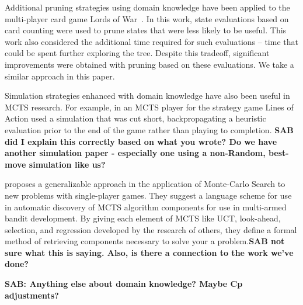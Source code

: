 \documentclass[letterpaper]{article}
\begin{document}
Additional pruning strategies using domain knowledge have been applied to the multi-player card game Lords of War~\cite{sephton2014ieee}. In this work, state evaluations based on card counting were used to prune states that were less likely to be useful. This work also considered the additional time required for such evaluations -- time that could be spent further exploring the tree. Despite this tradeoff, significant improvements were obtained with pruning based on these evaluations. We take a similar approach in this paper.

Simulation strategies enhanced with domain knowledge have also been useful in MCTS research. For example, in \cite{winands2010monte} an MCTS player for the strategy game Lines of Action used a simulation that was cut short, backpropagating a heuristic evaluation prior to the end of the game rather than playing to completion. {\bf SAB did I explain this correctly based on what you wrote? Do we have another simulation paper - especially one using a non-Random, best-move simulation like us?}

\cite{maes2012monte} proposes a generalizable approach in the application of Monte-Carlo Search to new problems with single-player games. They suggest a language scheme for use in automatic discovery of MCTS algorithm components for use in multi-armed bandit development. By giving each element of MCTS like UCT, look-ahead, selection, and regression developed by the research of others, they define a formal method of retrieving components necessary to solve your a problem.{\bf SAB not sure what this is saying. Also, is there a connection to the work we've done?}

{\bf SAB: Anything else about domain knowledge? Maybe Cp adjustments?}
\end{document}

